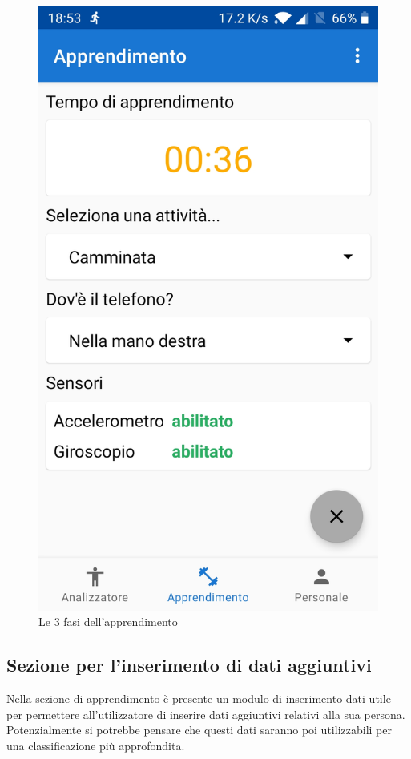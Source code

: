 \begin{figure}[H]
    \includegraphics[scale = 0.10]{assets/images/screenshots/2c_Learning.jpg}
    \caption{Le 3 fasi dell'apprendimento}
    \label{fig:screenshots_learning}
\end{figure}


\subsection{Sezione per l'inserimento di dati aggiuntivi}
Nella sezione di apprendimento è presente un modulo di inserimento dati utile per permettere all'utilizzatore di 
inserire dati aggiuntivi relativi alla sua persona. Potenzialmente si potrebbe pensare che questi dati saranno poi utilizzabili
per una classificazione più approfondita.

